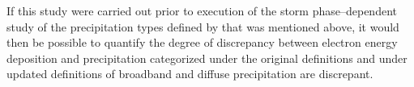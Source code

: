   If this study were carried out prior to execution of the storm
  phase--dependent study of the precipitation types defined by
  \citet{Newell2009}that was mentioned above, it would then be
  possible to quantify the degree of discrepancy between electron
  energy deposition and precipitation categorized under the original
  \citet{Newell2009} definitions and under updated definitions of
  broadband and diffuse precipitation are discrepant.

  
  
